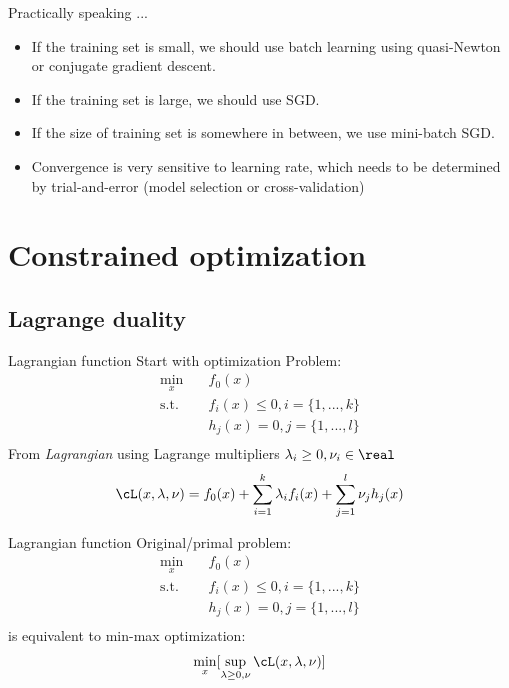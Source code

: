 \documentclass[draft]{beamer}
\begin{document}
\begin{frame}{Practically speaking ... }
	\begin{itemize}
		\item If the training set is small, we should use batch learning using quasi-Newton or conjugate gradient descent. 
		\item If the training set is large, we should use SGD. 
		\item If the size of training set is somewhere in between, we use mini-batch SGD. 
		\item Convergence is very sensitive to learning rate, which needs to be determined by trial-and-error (model selection or cross-validation) 
	\end{itemize}
\end{frame}
\section{Constrained optimization} 
\subsection{Lagrange duality} 

\begin{frame}{Lagrangian function} 
	Start with optimization Problem: 
	\begin{equation}
		\begin{aligned}
			\min_x \quad & f_0(x)  \\ 
			\textrm{s.t.} \quad & f_i(x) \le 0, i = \{1,...,k\} \\  
					 \quad & h_j(x) = 0, j = \{1,...,l\} \\ 
		\end{aligned}
	\end{equation}
	From \emph{Lagrangian} using Lagrange multipliers $\lambda_i \ge 0, \nu_i \in \real$ 
	\begin{equation}
		\cL(x,\lambda,\nu) = f_0(x)+\sum_{i=1}^{k} \lambda_i f_i(x) + \sum_{j=1}^{l} \nu_j h_j (x) 
	\end{equation}
\end{frame}

\begin{frame}
	{Lagrangian function}
	Original/primal problem: 
	\begin{equation*}
		\begin{aligned}
			\min_x \quad & f_0(x)  \\ 
			\textrm{s.t.} \quad & f_i(x) \le 0, i = \{1,...,k\} \\  
					 \quad & h_j(x) = 0, j = \{1,...,l\} \\ 
		\end{aligned}
	\end{equation*}
	is equivalent to min-max optimization: 
	\[\min_x [\sup_{\lambda \ge 0, \nu} \cL(x,\lambda, \nu)] \]
\end{frame}
\end{document}
